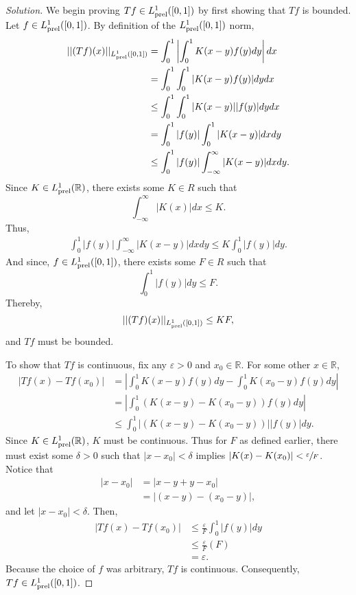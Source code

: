 \documentclass[11pt,letterpaper]{article}
\newcommand{\R}{\mathbb{R}}
\newcommand{\eps}{\varepsilon}
\renewcommand{\epsilon}{\eps}
\newcommand{\prel}{{\rm prel}}
\newenvironment{solution}
  {\renewcommand\qedsymbol{}\begin{proof}[Solution]}
  {\end{proof}\bigskip}
\begin{document}
\begin{solution}
 	We begin proving $Tf\in L_\prel^1([0,1])$ by first showing that $Tf$ is bounded. Let $f\in L_{\rm prel}^1([0,1])$. By definition of the $L_\prel^1([0,1])$ norm, 
 	\[\begin{split}
 		||(Tf)(x)||_{L_\prel^1([0,1])} &= \int_{0}^{1}\left |\int_{0}^{1}K(x-y)f(y)dy\right |dx\\
 		&= \int_{0}^{1} \int_{0}^{1} |K(x-y)f(y) |dydx\\
 		&\leq \int_{0}^{1} \int_{0}^{1} |K(x-y)||f(y)|dydx\\
 		&=\int_{0}^{1} |f(y)|\int_{0}^{1} |K(x-y)|dxdy\\
 		&\leq \int_{0}^{1} |f(y)|\int_{-\infty}^{\infty} |K(x-y)|dxdy.
 	\end{split}\] 
 	Since $K \in L_\prel^1(\R)$, there exists some $K \in R$ such that $$\int_{-\infty}^{\infty}|K(x)|dx \leq K.$$ Thus,
 	\[\begin{split}
 		\int_{0}^{1} |f(y)|\int_{-\infty}^{\infty} |K(x-y)|dxdy \leq K \int_{0}^{1} |f(y)|dy.
 	\end{split}\] And since, $f \in L_\prel^1([0,1])$, there exists some $F \in R$ such that $$\int_{0}^{1} |f(y)|dy \leq F.$$ Thereby, $$||(Tf)(x)||_{L_\prel^1([0,1])} \leq KF,$$ and $Tf$ must be bounded. 
 	
 	To show that $Tf$ is continuous, fix any $\epsilon > 0$ and $x_0 \in \R$. For some other $x\in \R$,
 	\[\begin{split}
 		|Tf(x)-Tf(x_0)| &= \left | \int_{0}^{1} K(x-y)f(y)dy - \int_{0}^{1} K(x_0-y)f(y)dy \right |\\
 		& = \left | \int_{0}^{1} \left (K(x-y) - K(x_0-y) \right ) f(y) dy \right |\\
 		&\leq \int_{0}^{1} \left | \left (K(x-y) - K(x_0-y) \right ) \right | |f(y)| dy.
 	\end{split}\]
 	Since $K \in L_\prel^1(\R)$, $K$ must be continuous. Thus for $F$ as defined earlier, there must exist some $\delta > 0$ such that $|x-x_0| < \delta$ implies $|K(x) - K(x_0)| < \sfrac{\epsilon}{F}$. Notice that
 	\[\begin{split}
 		|x-x_0| &= |x - y + y - x_0|\\
 		&= |(x - y) - (x_0-y)|,
 	\end{split}\] and let $|x-x_0| < \delta$. Then,
 	\[\begin{split}
 		|Tf(x)-Tf(x_0)| &\leq \frac{\epsilon}{F} \int_{0}^{1}  |f(y)| dy\\
 		&\leq \frac{\epsilon}{F} (F)\\
 		& = \epsilon.
 	\end{split}\]
 	Because the choice of $f$ was arbitrary, $Tf$ is continuous. Consequently, $Tf \in L_\prel^1([0,1])$.
 	

\end{solution}
\end{document}
